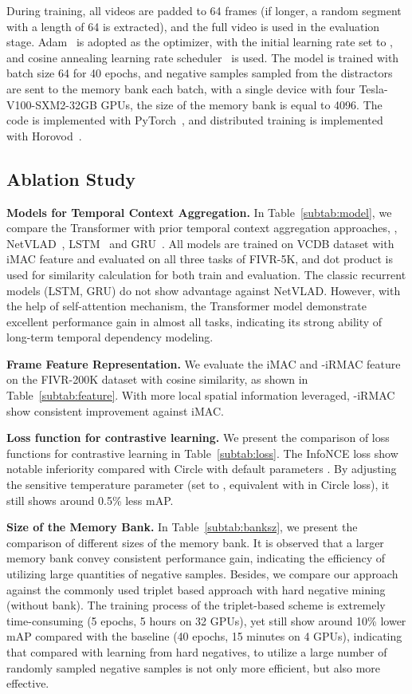 \documentclass[10pt,twocolumn,letterpaper]{article}
\begin{document}
During training, all videos are padded to 64 frames (if longer, a random segment with a length of 64 is extracted), and the full video is used in the evaluation stage. Adam~\cite{kingma2014adam} is adopted as the optimizer, with the initial learning rate set to , and cosine annealing learning rate scheduler~\cite{loshchilov2016sgdr} is used. The model is trained with batch size 64 for 40 epochs, and  negative samples sampled from the distractors are sent to the memory bank each batch, with a single device with four Tesla-V100-SXM2-32GB GPUs, the size of the memory bank is equal to 4096.
The code is implemented with PyTorch~\cite{Paszke2019PyTorchAI}, and distributed training is implemented with Horovod~\cite{Sergeev2018HorovodFA}.

\subsection{Ablation Study} \label{subsection:ablation}

\textbf{Models for Temporal Context Aggregation.}
In Table~\ref{subtab:model}, we compare the Transformer with prior temporal context aggregation approaches, \ie, NetVLAD~\cite{arandjelovic2016netvlad}, LSTM~\cite{hochreiter1997long} and GRU~\cite{cho2014properties}. All models are trained on VCDB dataset with iMAC feature and evaluated on all three tasks of FIVR-5K, and dot product is used for similarity calculation for both train and evaluation. The classic recurrent models (LSTM, GRU) do not show advantage against NetVLAD. However, with the help of self-attention mechanism, the Transformer model demonstrate excellent performance gain in almost all tasks, indicating its strong ability of long-term temporal dependency modeling.

\textbf{Frame Feature Representation.}
We evaluate the iMAC and -iRMAC feature on the FIVR-200K dataset with cosine similarity, as shown in Table~\ref{subtab:feature}. With more local spatial information leveraged, -iRMAC show consistent improvement against iMAC. 

\textbf{Loss function for contrastive learning.}
We present the comparison of loss functions for contrastive learning in Table~\ref{subtab:loss}. The InfoNCE loss show notable inferiority compared with Circle with default parameters . By adjusting the sensitive temperature parameter  (set to , equivalent with  in Circle loss), it still shows around 0.5\% less mAP.


\textbf{Size of the Memory Bank.}
In Table~\ref{subtab:banksz}, we present the comparison of different sizes of the memory bank. It is observed that a larger memory bank convey consistent performance gain, indicating the efficiency of utilizing large quantities of negative samples.
Besides, we compare our approach against the commonly used triplet based approach with hard negative mining~\cite{kordopatis2017dml} (without bank). The training process of the triplet-based scheme is extremely time-consuming (5 epochs, 5 hours on 32 GPUs), yet still show around 10\% lower mAP compared with the baseline (40 epochs, 15 minutes on 4 GPUs), indicating that compared with learning from hard negatives, to utilize a large number of randomly sampled negative samples is not only more efficient, but also more effective. 
\end{document}
